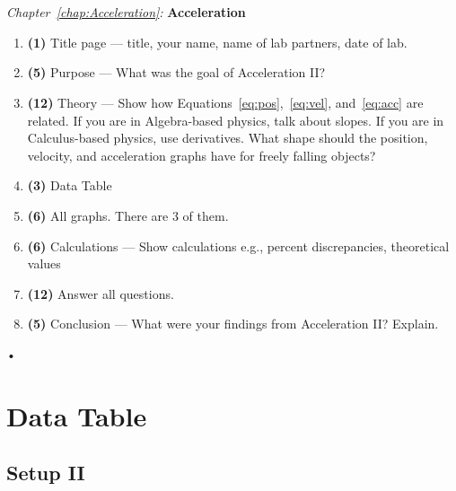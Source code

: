\documentclass[main.tex]{subfiles}
\begin{document}
\begin{samepage}
\hrulefill\\ \\
\emph{Chapter~\ref{chap:Acceleration}:} \textbf{Acceleration}
\begin{enumerate}
\item
\textbf{(1)} Title page --- title, your name, name of lab partners, date of lab.
\item
\textbf{(5)} Purpose --- What was the goal of Acceleration II?
\item
\textbf{(12)} Theory --- Show how Equations~\eqref{eq:pos},~\eqref{eq:vel}, and~\eqref{eq:acc} are related. If you are in Algebra-based physics, talk about slopes. If you are in Calculus-based physics, use derivatives. What shape should the position, velocity, and acceleration graphs have for freely falling objects?
\item
\textbf{(3)} Data Table 
\item
\textbf{(6)} All graphs. There are 3 of them.
\item
\textbf{(6)} Calculations --- Show calculations e.g., percent discrepancies, theoretical values
\item
\textbf{(12)} Answer all questions.
\item
\textbf{(5)} Conclusion --- What were your findings from Acceleration II? Explain.
\end{enumerate}•
\end{samepage}

\newpage
\section{Data Table}
\subsection*{Setup II}
\begin{doublespace}
\end{doublespace}
\end{document}
